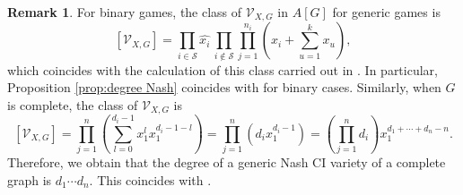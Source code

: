 \documentclass[11pt]{amsart}
\numberwithin{equation}{section}
\theoremstyle{plain}
\numberwithin{theorem}{section}
\theoremstyle{definition}
\newtheorem{remark}[theorem]{Remark}
\newcommand{\Vc}{{\mathcal V}_{X,G}}
\begin{document}
\begin{remark}
    For binary games, the class of $\Vc$ in $A[G]$ for generic games is 
    \[
    \left[\Vc\right] = \displaystyle  \prod_{i\in\mathcal S}  \widehat{x_i} \,\prod_{i\not\in\mathcal S}\prod_{j=1}^{n_i}\left( x_i+\sum_{u=1}^kx_u
        \right),
    \]
    which coincides with the calculation of this class carried out in \cite{portakal2024game}. In particular, Proposition \ref{prop:degree Nash} coincides with \cite[Proposition 26]{portakal2024game} for binary cases. Similarly, when $G$ is complete, the class of $\Vc$ is 
    \[
    \left[ \Vc\right] = \prod_{j=1}^{n}\left(    
        \sum_{l=0}^{d_{i}-1} x_1^lx_1^{d_{i}-1-l}\right)=\prod_{j=1}^{n}\left(    
        d_i x_1^{d_{i}-1}
        \right)=\left(\prod_{j=1}^{n}    
        d_i \right)x_1^{d_{1}+\cdots+d_n-n}.   
    \]
    Therefore, we obtain that the degree of a generic Nash CI variety of a complete graph is $d_1\cdots d_n$. This coincides with \cite[Theorem 6]{portakal2022geometry}.
\end{remark}
\end{document}
